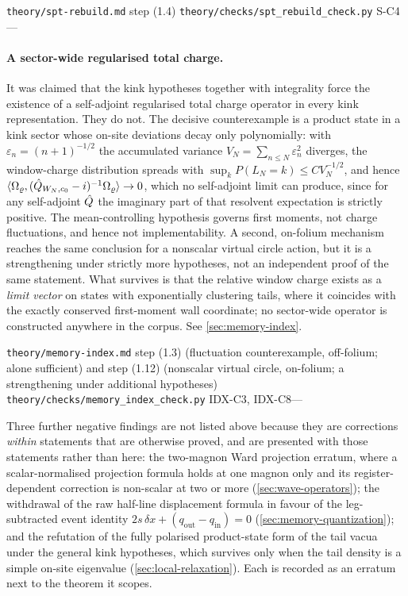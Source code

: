 %
{\texttt{theory/spt-rebuild.md} step (1.4)}%
{\texttt{theory/checks/spt\_rebuild\_check.py} S-C4}{---}

\paragraph{A sector-wide regularised total charge.} \statusRefuted{} It was
claimed that the kink hypotheses together with integrality force the existence
of a self-adjoint regularised total charge operator in every kink
representation. They do not. The decisive counterexample is a product state in
a kink sector whose on-site deviations decay only polynomially: with
$\varepsilon_n = (n+1)^{-1/2}$ the accumulated variance
$V_N = \sum_{n \le N}\varepsilon_n^2$ diverges, the window-charge distribution
spreads with $\sup_k P(L_N = k) \le C V_N^{-1/2}$, and hence
$\langle \Omega_\varrho, (\hat{Q}_{W_N,c_0} - i)^{-1}\Omega_\varrho\rangle \to 0$,
which no self-adjoint limit can produce, since for any self-adjoint $\hat{Q}$
the imaginary part of that resolvent expectation is strictly positive. The
mean-controlling hypothesis governs first moments, not charge fluctuations,
and hence not implementability. A second, on-folium mechanism reaches the same
conclusion for a nonscalar virtual circle action, but it is a strengthening
under strictly more hypotheses, not an independent proof of the same
statement. What survives is that the relative window charge exists as a
\emph{limit vector} on states with exponentially clustering tails, where it
coincides with the exactly conserved first-moment wall coordinate; no
sector-wide operator is constructed anywhere in the corpus. See
\cref{sec:memory-index}.

%
{\texttt{theory/memory-index.md} step (1.3) (fluctuation counterexample, off-folium; alone sufficient) and step (1.12) (nonscalar virtual circle, on-folium; a strengthening under additional hypotheses)}%
{\texttt{theory/checks/memory\_index\_check.py} IDX-C3, IDX-C8}{---}

\begin{remark}
Three further negative findings are not listed above because they are
corrections \emph{within} statements that are otherwise proved, and are
presented with those statements rather than here: the two-magnon Ward
projection erratum, where a scalar-normalised projection formula holds at one
magnon only and its register-dependent correction is non-scalar at two or more
(\cref{sec:wave-operators}); the withdrawal of the raw half-line displacement
formula in favour of the leg-subtracted event identity $2s\,\delta x +
(q_{\mathrm{out}} - q_{\mathrm{in}}) = 0$ (\cref{sec:memory-quantization});
and the refutation of the fully polarised product-state form of the tail vacua
under the general kink hypotheses, which survives only when the tail density is
a simple on-site eigenvalue (\cref{sec:local-relaxation}). Each is recorded as
an erratum next to the theorem it scopes.
\end{remark}

